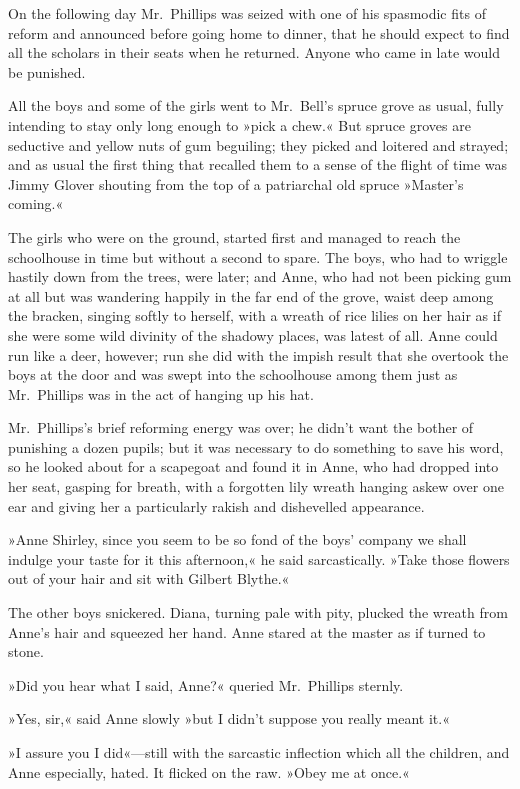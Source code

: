 On the following day Mr.~Phillips was seized with one of his spasmodic fits of reform and announced before going home to dinner, that he should expect to find all the scholars in their seats when he returned. Anyone who came in late would be punished.

All the boys and some of the girls went to Mr.~Bell's spruce grove as usual, fully intending to stay only long enough to »pick a chew.« But spruce groves are seductive and yellow nuts of gum beguiling; they picked and loitered and strayed; and as usual the first thing that recalled them to a sense of the flight of time was Jimmy Glover shouting from the top of a patriarchal old spruce »Master's coming.«

The girls who were on the ground, started first and managed to reach the schoolhouse in time but without a second to spare. The boys, who had to wriggle hastily down from the trees, were later; and Anne, who had not been picking gum at all but was wandering happily in the far end of the grove, waist deep among the bracken, singing softly to herself, with a wreath of rice lilies on her hair as if she were some wild divinity of the shadowy places, was latest of all. Anne could run like a deer, however; run she did with the impish result that she overtook the boys at the door and was swept into the schoolhouse among them just as Mr.~Phillips was in the act of hanging up his hat.

Mr.~Phillips's brief reforming energy was over; he didn't want the bother of punishing a dozen pupils; but it was necessary to do something to save his word, so he looked about for a scapegoat and found it in Anne, who had dropped into her seat, gasping for breath, with a forgotten lily wreath hanging askew over one ear and giving her a particularly rakish and dishevelled appearance.

»Anne Shirley, since you seem to be so fond of the boys' company we shall indulge your taste for it this afternoon,« he said sarcastically. »Take those flowers out of your hair and sit with Gilbert Blythe.«

The other boys snickered. Diana, turning pale with pity, plucked the wreath from Anne's hair and squeezed her hand. Anne stared at the master as if turned to stone.

»Did you hear what I said, Anne?« queried Mr.~Phillips sternly.

»Yes, sir,« said Anne slowly »but I didn't suppose you really meant it.«

»I assure you I did«—still with the sarcastic inflection which all the children, and Anne especially, hated. It flicked on the raw. »Obey me at once.«

